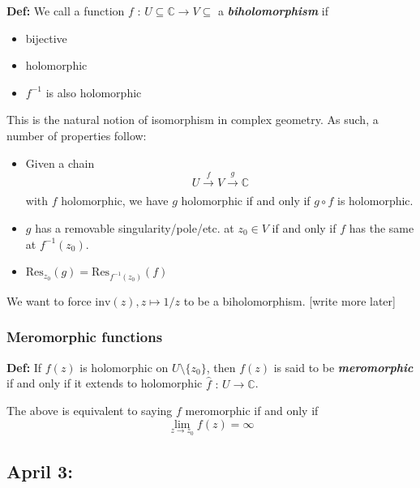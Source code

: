 \documentclass[11pt]{article}
\newcommand{\C}{\mathbb{C}}
\begin{document}
\vskip 0.5cm
\begin{bluebox}
    \textbf{Def:} We call a function $f \text{ : } U \subseteq \C \rightarrow V \subseteq$ a \emph{\textbf{biholomorphism}} if 
    \begin{itemize}
        \item bijective
        \item holomorphic
        \item $f^{-1}$ is also holomorphic
    \end{itemize}
\end{bluebox}

This is the natural notion of isomorphism in complex geometry. As such, a number of properties follow:

\begin{redbox}
    \begin{itemize}
        \item Given a chain
        \[ U \xrightarrow[]{f} V \xrightarrow[]{g} \C \] with $f$ holomorphic, we have $g$ holomorphic if and only if $g \circ f$ is holomorphic.
        \item $g$ has a removable singularity/pole/etc. at $z_0 \in V$ if and only if $f$ has the same at $f^{-1}(z_0)$.
        \item $\mathrm{Res}_{z_0}(g) = \mathrm{Res}_{f^{-1}(z_0)}(f)$
    \end{itemize}
\end{redbox}

\vskip 0.5cm
We want to force $\mathrm{inv}(z), z \mapsto 1/z$ to be a biholomorphism. [write more later]

\vskip 0.5cm
\subsubsection{Meromorphic functions}

\vskip 0.5cm
\begin{bluebox}
    \textbf{Def:} If $f(z)$ is holomorphic on $U \setminus \{z_0\}$, then $f(z)$ is said to be \emph{\textbf{meromorphic}} if and only if it extends to holomorphic $\hat{f} \text{ : } U \rightarrow \hat{\C}$. 

    \vskip 0.5cm
    The above is equivalent to saying $f$ meromorphic if and only if 
    \[ \lim_{z \rightarrow z_0} f(z) = \infty \]
\end{bluebox}



\pagebreak
\subsection{April 3: }
\end{document}
